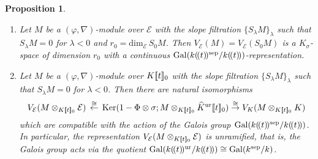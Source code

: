 \documentclass[11pt]{amsart}
\newtheorem{proposition}[Lemma]{Proposition}
\begin{document}
\begin{proposition}\label{rep} 
\begin{enumerate}
\item Let $M$ be a $(\varphi, \nabla)$-module over $\mathcal E$ with 
the slope filtration $\{ S_\lambda M\}_\lambda$ such that $S_\lambda M = 0$ for $\lambda < 0$
and $r_0 = \mathrm{dim}_{\mathcal E}\, S_0M$. 
Then $V_{\mathcal E}(M) = V_{\mathcal E}(S_0M)$ is a $K_\sigma$-space of dimension $r_0$ 
with a continuous 
$\mathrm{Gal}(k(\hspace*{-0.5mm}(t)\hspace*{-0.5mm})^{\mathrm{sep}}/k(\hspace*{-0.5mm}(t)\hspace*{-0.5mm}))$-representation. 
\item Let $M$ be a $(\varphi, \nabla)$-module over $K[\hspace*{-0.6mm}[t]\hspace*{-0.6mm}]_0$ with 
the slope filtration $\{ S_\lambda M\}_\lambda$ such that $S_\lambda M = 0$ for $\lambda < 0$. 
Then there are natural isomorphisms
$$
      V_{\mathcal E}(M \otimes_{K[\hspace*{-0.6mm}[t]\hspace*{-0.6mm}]_0} \mathcal E)\, \overset{\cong}{\leftarrow}\,  
      \mathrm{Ker}(1 -\Phi\otimes\sigma; M \otimes_{K[\hspace*{-0.6mm}[t]\hspace*{-0.6mm}]_0} 
      \widehat{K}^{\mathrm{ur}}[\hspace*{-0.6mm}[t]\hspace*{-0.6mm}]_0) \overset{\cong}{\rightarrow}
      V_K(M \otimes_{K[\hspace*{-0.6mm}[t]\hspace*{-0.6mm}]_0} K)
$$
which are compatible with the action of the Galois group 
$\mathrm{Gal}(k(\hspace*{-0.5mm}(t)\hspace*{-0.5mm})^{\mathrm{sep}}/k(\hspace*{-0.5mm}(t)\hspace*{-0.5mm}))$. 
In particular, the representation 
$V_{\mathcal E}(M \otimes_{K[\hspace*{-0.6mm}[t]\hspace*{-0.6mm}]_0} \mathcal E)$ is unramified, that is, 
the Galois group  
acts via the quotient  
$\mathrm{Gal}(k(\hspace*{-0.5mm}(t)\hspace*{-0.5mm})^{\mathrm{ur}}/k(\hspace*{-0.5mm}(t)\hspace*{-0.5mm})) 
\cong \mathrm{Gal}(k^{\mathrm{sep}}/k)$. 
\end{enumerate}
\end{proposition}
\end{document}
